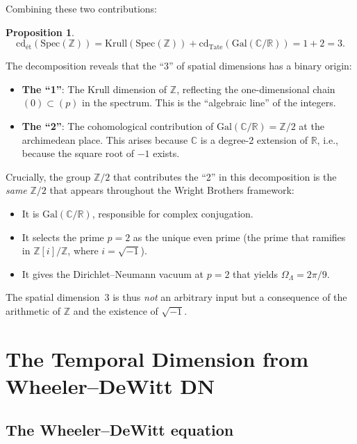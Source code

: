 \documentclass[12pt,a4paper]{article}
\newtheorem{proposition}[theorem]{Proposition}
\theoremstyle{definition}
\newcommand{\Spec}{\mathrm{Spec}}
\newcommand{\Gal}{\mathrm{Gal}}
\newcommand{\cd}{\mathrm{cd}}
\newcommand{\Krull}{\mathrm{Krull}}
\newcommand{\ZZ}{\mathbb{Z}}
\newcommand{\RR}{\mathbb{R}}
\newcommand{\CC}{\mathbb{C}}
\begin{document}
Combining these two contributions:

\begin{proposition}\label{prop:decomposition}
\[
  \cd_{\text{\'et}}(\Spec(\ZZ)) = \Krull(\Spec(\ZZ)) + \cd_{\mathrm{Tate}}(\Gal(\CC/\RR))
  = 1 + 2 = 3.
\]
\end{proposition}

The decomposition reveals that the ``3'' of spatial dimensions has a binary origin:
\begin{itemize}
  \item \textbf{The ``1''}: The Krull dimension of $\ZZ$, reflecting the one-dimensional
    chain $(0) \subset (p)$ in the spectrum. This is the ``algebraic line'' of the integers.
  \item \textbf{The ``2''}: The cohomological contribution of $\Gal(\CC/\RR) = \ZZ/2$
    at the archimedean place. This arises because $\CC$ is a degree-2 extension of
    $\RR$, i.e., because the square root of $-1$ exists.
\end{itemize}

Crucially, the group $\ZZ/2$ that contributes the ``2'' in this decomposition is
the \emph{same} $\ZZ/2$ that appears throughout the Wright Brothers framework:
\begin{itemize}
  \item It is $\Gal(\CC/\RR)$, responsible for complex conjugation.
  \item It selects the prime $p=2$ as the unique even prime (the prime that ramifies
    in $\ZZ[i]/\ZZ$, where $i = \sqrt{-1}$).
  \item It gives the Dirichlet--Neumann vacuum at $p=2$ that yields
    $\Omega_\Lambda = 2\pi/9$.
\end{itemize}

The spatial dimension~3 is thus \emph{not} an arbitrary input but a consequence of
the arithmetic of $\ZZ$ and the existence of $\sqrt{-1}$.

\section{The Temporal Dimension from Wheeler--DeWitt DN}\label{sec:WDW}

\subsection{The Wheeler--DeWitt equation}
\end{document}
